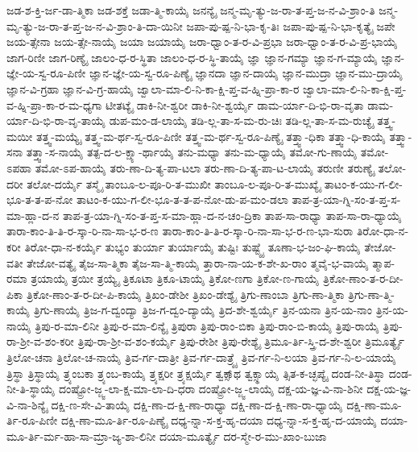 {ಜಡ-ಶ-ಕ್ತಿ-ರ್ಜ-ಡಾ-ತ್ಮಿಕಾ
ಜಡ-ಶಕ್ತೆ
ಜಡಾ-ತ್ಮಿ-ಕಾಯೈ
ಜನನ್ಯೈ
ಜನ್ಮ-ಮೃ-ತ್ಯು-ಜ-ರಾ-ತ-ಪ್ತ-ಜ-ನ-ವಿ-ಶ್ರಾಂ-ತಿ
ಜನ್ಮ-ಮೃ-ತ್ಯು-ಜ-ರಾ-ತ-ಪ್ತ-ಜ-ನ-ವಿ-ಶ್ರಾಂ-ತಿ-ದಾ-ಯಿನೀ
ಜಪಾ-ಪು-ಷ್ಪ-ನಿ-ಭಾ-ಕೃ-ತಿಃ
ಜಪಾ-ಪು-ಷ್ಪ-ನಿ-ಭಾ-ಕೃತ್ಯೈ
ಜಪೇ
ಜಯ-ತ್ಸೇನಾ
ಜಯ-ತ್ಸೇ-ನಾಯೈ
ಜಯಾ
ಜಯಾಯೈ
ಜರಾ-ಧ್ವಾಂ-ತ-ರ-ವಿ-ಪ್ರಭಾ
ಜರಾ-ಧ್ವಾಂ-ತ-ರ-ವಿ-ಪ್ರ-ಭಾಯೈ
ಜಾಗ-ರಿಣೀ
ಜಾಗ-ರಿಣ್ಯೈ
ಜಾಲಂ-ಧ-ರ-ಸ್ಥಿತಾ
ಜಾಲಂ-ಧ-ರ-ಸ್ಥಿ-ತಾಯೈ
ಜ್ಞಾ
ಜ್ಞಾನ-ಗಮ್ಯಾ
ಜ್ಞಾನ-ಗ-ಮ್ಯಾಯೈ
ಜ್ಞಾನ-ಜ್ಞೇ-ಯ-ಸ್ವ-ರೂ-ಪಿಣೀ
ಜ್ಞಾನ-ಜ್ಞೇ-ಯ-ಸ್ವ-ರೂ-ಪಿಣ್ಯೈ
ಜ್ಞಾನದಾ
ಜ್ಞಾನ-ದಾಯೈ
ಜ್ಞಾನ-ಮುದ್ರಾ
ಜ್ಞಾನ-ಮು-ದ್ರಾಯೈ
ಜ್ಞಾನ-ವಿ-ಗ್ರಹಾ
ಜ್ಞಾನ-ವಿ-ಗ್ರ-ಹಾಯೈ
ಜ್ವಾಲಾ-ಮಾ-ಲಿ-ನಿ-ಕಾ-ಕ್ಷಿ-ಪ್ತ-ವ-ಹ್ನಿ-ಪ್ರಾ-ಕಾ-ರ
ಜ್ವಾಲಾ-ಮಾ-ಲಿ-ನಿ-ಕಾ-ಕ್ಷಿ-ಪ್ತ-ವ-ಹ್ನಿ-ಪ್ರಾ-ಕಾ-ರ-ಮ-ಧ್ಯಗಾ
ಟೀತಟ್ಯೈ
ಡಾಕಿ-ನೀ-ಶ್ವರೀ
ಡಾಕಿ-ನೀ-ಶ್ವರ್ಯೈ
ಡಾಮ-ರ್ಯಾ-ದಿ-ಭಿ-ರಾ-ವೃತಾ
ಡಾಮ-ರ್ಯಾ-ದಿ-ಭಿ-ರಾ-ವೃ-ತಾಯೈ
ಡುಪ-ಮಂ-ಡ-ಲಾಯೈ
ತಡಿ-ಲ್ಲ-ತಾ-ಸ-ಮ-ರು-ಚಿಃ
ತಡಿ-ಲ್ಲ-ತಾ-ಸ-ಮ-ರುಚ್ಯೈ
ತತ್ತ್ವ-ಮಯೀ
ತತ್ತ್ವ-ಮಯ್ಯೈ
ತತ್ತ್ವ-ಮ-ರ್ಥ-ಸ್ವ-ರೂ-ಪಿಣೀ
ತತ್ತ್ವ-ಮ-ರ್ಥ-ಸ್ವ-ರೂ-ಪಿಣ್ಯೈ
ತತ್ತ್ವಾ-ಧಿಕಾ
ತತ್ತ್ವಾ-ಧಿ-ಕಾಯೈ
ತತ್ತ್ವಾ-ಸನಾ
ತತ್ತ್ವಾ-ಸ-ನಾಯೈ
ತತ್ಪ-ದ-ಲ-ಕ್ಷ್ಯಾ-ರ್ಥಾಯೈ
ತನು-ಮಧ್ಯಾ
ತನು-ಮ-ಧ್ಯಾಯೈ
ತಮೋ-ಗು-ಣಾಯೈ
ತಮೋ-ಽಪಹಾ
ತಮೋ-ಽಪ-ಹಾಯೈ
ತರು-ಣಾ-ದಿ-ತ್ಯ-ಪಾ-ಟಲಾ
ತರು-ಣಾ-ದಿ-ತ್ಯ-ಪಾ-ಟ-ಲಾಯೈ
ತರುಣೀ
ತರುಣ್ಯೈ
ತಲೋ-ದರೀ
ತಲೋ-ದರ್ಯೈ
ತಸ್ಮೈ
ತಾಂಬೂ-ಲ-ಪೂ-ರಿ-ತ-ಮುಖೀ
ತಾಂಬೂ-ಲ-ಪೂ-ರಿ-ತ-ಮುಖ್ಯೈ
ತಾಟಂ-ಕ-ಯು-ಗ-ಲೀ-ಭೂ-ತ-ತ-ಪ-ನೋ
ತಾಟಂ-ಕ-ಯು-ಗ-ಲೀ-ಭೂ-ತ-ತ-ಪ-ನೋ-ಡು-ಪ-ಮಂ-ಡಲಾ
ತಾಪ-ತ್ರ-ಯಾ-ಗ್ನಿ-ಸಂ-ತ-ಪ್ತ-ಸ-ಮಾ-ಹ್ಲಾ-ದ-ನ
ತಾಪ-ತ್ರ-ಯಾ-ಗ್ನಿ-ಸಂ-ತ-ಪ್ತ-ಸ-ಮಾ-ಹ್ಲಾ-ದ-ನ-ಚಂ-ದ್ರಿಕಾ
ತಾಪ-ಸಾ-ರಾಧ್ಯಾ
ತಾಪ-ಸಾ-ರಾ-ಧ್ಯಾಯೈ
ತಾರಾ-ಕಾಂ-ತಿ-ತಿ-ರ-ಸ್ಕಾ-ರಿ-ನಾ-ಸಾ-ಭ-ರ-ಣ
ತಾರಾ-ಕಾಂ-ತಿ-ತಿ-ರ-ಸ್ಕಾ-ರಿ-ನಾ-ಸಾ-ಭ-ರ-ಣ-ಭಾ-ಸುರಾ
ತಿರೋ-ಧಾ-ನ-ಕರೀ
ತಿರೋ-ಧಾ-ನ-ಕರ್ಯೈ
ತುಭ್ಯಂ
ತುರ್ಯಾ
ತುರ್ಯಾಯೈ
ತುಷ್ಟಿಃ
ತುಷ್ಟ್ಯೈ
ತೂಣಾ-ಭ-ಜಂ-ಘಿ-ಕಾಯೈ
ತೇಜೋ-ವತೀ
ತೇಜೋ-ವತ್ಯೈ
ತೈಜ-ಸಾ-ತ್ಮಿಕಾ
ತೈಜ-ಸಾ-ತ್ಮಿ-ಕಾಯೈ
ತ್ತಾರಾ-ನಾ-ಯ-ಕ-ಶೇ-ಖ-ರಾಂ
ತ್ಮವೈ-ಭ-ವಾಯೈ
ತ್ಮಾಪ-ರಮಾ
ತ್ರಯಾಯೈ
ತ್ರಯೀ
ತ್ರಯ್ಯೈ
ತ್ರಿಕೂಟಾ
ತ್ರಿಕೂ-ಟಾಯೈ
ತ್ರಿಕೋ-ಣಗಾ
ತ್ರಿಕೋ-ಣ-ಗಾಯೈ
ತ್ರಿಕೋ-ಣಾಂ-ತ-ರ-ದೀ-ಪಿಕಾ
ತ್ರಿಕೋ-ಣಾಂ-ತ-ರ-ದೀ-ಪಿ-ಕಾಯೈ
ತ್ರಿಖಂ-ಡೇಶೀ
ತ್ರಿಖಂ-ಡೇಶ್ಯೈ
ತ್ರಿಗು-ಣಾಂಬಾ
ತ್ರಿಗು-ಣಾ-ತ್ಮಿಕಾ
ತ್ರಿಗು-ಣಾ-ತ್ಮಿ-ಕಾಯೈ
ತ್ರಿಗು-ಣಾಯೈ
ತ್ರಿಜ-ಗ-ದ್ವಂದ್ಯಾ
ತ್ರಿಜ-ಗ-ದ್ವಂ-ದ್ಯಾಯೈ
ತ್ರಿದ-ಶೇ-ಶ್ವರ್ಯೈ
ತ್ರಿನ-ಯನಾ
ತ್ರಿನ-ಯ-ನಾಂ
ತ್ರಿನ-ಯ-ನಾಯೈ
ತ್ರಿಪು-ರ-ಮಾ-ಲಿನೀ
ತ್ರಿಪು-ರ-ಮಾ-ಲಿನ್ಯೈ
ತ್ರಿಪುರಾ
ತ್ರಿಪು-ರಾಂ-ಬಿಕಾ
ತ್ರಿಪು-ರಾಂ-ಬಿ-ಕಾಯೈ
ತ್ರಿಪು-ರಾಯೈ
ತ್ರಿಪು-ರಾ-ಶ್ರೀ-ವ-ಶಂ-ಕರೀ
ತ್ರಿಪು-ರಾ-ಶ್ರೀ-ವ-ಶಂ-ಕರ್ಯೈ
ತ್ರಿಪು-ರೇಶೀ
ತ್ರಿಪು-ರೇಶ್ಯೈ
ತ್ರಿಮೂ-ರ್ತಿ-ಸ್ತ್ರಿ-ದ-ಶೇ-ಶ್ವರೀ
ತ್ರಿಮೂರ್ತ್ಯೈ
ತ್ರಿಲೋ-ಚನಾ
ತ್ರಿಲೋ-ಚ-ನಾಯೈ
ತ್ರಿವ-ರ್ಗ-ದಾತ್ರೀ
ತ್ರಿವ-ರ್ಗ-ದಾತ್ರ್ಯೈ
ತ್ರಿವ-ರ್ಗ-ನಿ-ಲಯಾ
ತ್ರಿವ-ರ್ಗ-ನಿ-ಲ-ಯಾಯೈ
ತ್ರಿಸ್ಥಾ
ತ್ರಿಸ್ಥಾಯೈ
ತ್ರ್ಯಂಬಕಾ
ತ್ರ್ಯಂಬ-ಕಾಯೈ
ತ್ರ್ಯಕ್ಷರೀ
ತ್ರ್ಯಕ್ಷರ್ಯೈ
ತ್ವಕ್ಸಾ್ಥ
ತ್ವಕ್ಸ್ಥಾಯೈ
ತ್ಸಿತ-ಕ-ಚ್ಛಪ್ಯೈ
ದಂಡ-ನೀ-ತಿಸ್ಥಾ
ದಂಡ-ನೀ-ತಿ-ಸ್ಥಾಯೈ
ದಂಷ್ಟ್ರೋ-ಜ್ಜ್ವ-ಲಾ-ಕ್ಷ-ಮಾ-ಲಾ-ದಿ-ಧರಾ
ದಂಷ್ಟ್ರೋ-ಜ್ಜ್ವ-ಲಾಯೈ
ದಕ್ಷ-ಯ-ಜ್ಞ-ವಿ-ನಾ-ಶಿನೀ
ದಕ್ಷ-ಯ-ಜ್ಞ-ವಿ-ನಾ-ಶಿನ್ಯೈ
ದಕ್ಷಿ-ಣ-ಸೇ-ವಿ-ತಾಯೈ
ದಕ್ಷಿ-ಣಾ-ದ-ಕ್ಷಿ-ಣಾ-ರಾಧ್ಯಾ
ದಕ್ಷಿ-ಣಾ-ದ-ಕ್ಷಿ-ಣಾ-ರಾ-ಧ್ಯಾಯೈ
ದಕ್ಷಿ-ಣಾ-ಮೂ-ರ್ತಿ-ರೂ-ಪಿಣೀ
ದಕ್ಷಿ-ಣಾ-ಮೂ-ರ್ತಿ-ರೂ-ಪಿಣ್ಯೈ
ದಧ್ಯ-ನ್ನಾ-ಸ-ಕ್ತ-ಹೃ-ದಯಾ
ದಧ್ಯ-ನ್ನಾ-ಸ-ಕ್ತ-ಹೃ-ದ-ಯಾಯೈ
ದಯಾ-ಮೂ-ರ್ತಿ-ರ್ಮ-ಹಾ-ಸಾ-ಮ್ರಾ-ಜ್ಯ-ಶಾ-ಲಿನೀ
ದಯಾ-ಮೂರ್ತ್ಯೈ
ದರ-ಸ್ಮೇ-ರ-ಮು-ಖಾಂ-ಬುಜಾ
}
